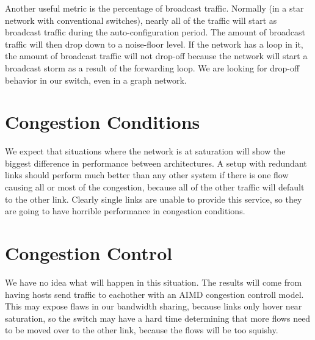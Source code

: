 \documentclass{article}
\begin{document}
Another useful metric is the percentage of broadcast traffic.
Normally (in a star network with conventional switches), nearly all of the traffic will start as broadcast traffic during the auto-configuration period.
The amount of broadcast traffic will then drop down to a noise-floor level.
If the network has a loop in it, the amount of broadcast traffic will not drop-off because the network will start a broadcast storm as a result of the forwarding loop.
We are looking for drop-off behavior in our switch, even in a graph network.


\section{Congestion Conditions}
We expect that situations where the network is at saturation will show the biggest difference in performance between architectures.
A setup with redundant links should perform much better than any other system if there is one flow causing all or most of the congestion, because all of the other traffic will default to the other link.
Clearly single links are unable to provide this service, so they are going to have horrible performance in congestion conditions.
\section{Congestion Control}
We have no idea what will happen in this situation.
The results will come from having hosts send traffic to eachother with an AIMD congestion controll model.
This may expose flaws in our bandwidth sharing, because links only hover near saturation, so the switch may have a hard time determining that more flows need to be moved over to the other link, because the flows will be too squishy.
\end{document}
